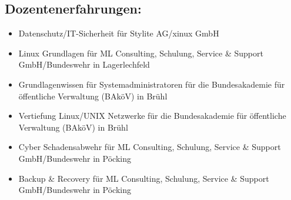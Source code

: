 \documentclass{article}
\begin{document}
\subsection{Dozentenerfahrungen:}

\begin{itemize}
\item Datenschutz/IT-Sicherheit für Stylite AG/xinux GmbH
\item Linux Grundlagen für ML Consulting, Schulung, Service \& Support GmbH/Bundeswehr in Lagerlechfeld
\item Grundlagenwissen für Systemadministratoren für die Bundesakademie für öffentliche Verwaltung (BAköV) in Brühl
\item Vertiefung Linux/UNIX Netzwerke für die Bundesakademie für öffentliche Verwaltung (BAköV) in Brühl
\item Cyber Schadensabwehr für ML Consulting, Schulung, Service \& Support GmbH/Bundeswehr in Pöcking
\item Backup \& Recovery für ML Consulting, Schulung, Service \& Support GmbH/Bundeswehr in Pöcking
\end{itemize}
\end{document}
